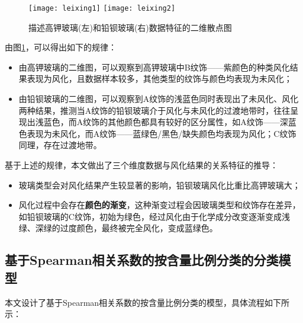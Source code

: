 \documentclass[withoutpreface,bwprint]{cumcmthesis} %
\begin{document}
\begin{figure}[!h]
	\centering
	\texttt{[image: leixing1]}
	\texttt{[image: leixing2]}
	\caption{描述高钾玻璃(左)和铅钡玻璃(右)数据特征的二维散点图}
	\label{leixing}
\end{figure}


由图\ref{leixing}，可以得出如下的规律：
\begin{itemize}
	\item 由高钾玻璃的二维图，可以观察到高钾玻璃中B纹饰——紫颜色的种类风化结果表现为风化，且数据样本较多，其他类型的纹饰与颜色均表现为未风化；
	\item 由铅钡玻璃的二维图，可以观察到A纹饰的浅蓝色同时表现出了未风化、风化两种结果，推测当A纹饰的铅钡玻璃介于风化与未风化的过渡地带时，往往呈现出浅蓝色，而A纹饰的其他颜色都具有较好的区分属性，如A纹饰——深蓝色表现为未风化，而A纹饰——蓝绿色/黑色/缺失颜色均表现为风化；C纹饰同理，存在过渡地带。
\end{itemize}


基于上述的规律，本文做出了三个维度数据与风化结果的关系特征的推导：
\begin{itemize}
	\item 玻璃类型会对风化结果产生较显著的影响，铅钡玻璃风化比重比高钾玻璃大；
	\item 风化过程中会存在\textbf{颜色的渐变}，这种渐变过程会因玻璃类型和纹饰存在差异，如铅钡玻璃的C纹饰，初始为绿色，经过风化由于化学成分改变逐渐变成浅绿、深绿的过度颜色，最终被完全风化，变成蓝绿色。
\end{itemize}


\subsection{基于Spearman相关系数的按含量比例分类的分类模型}

本文设计了基于Spearman相关系数的按含量比例分类的模型，具体流程如下所示：
\end{document}
